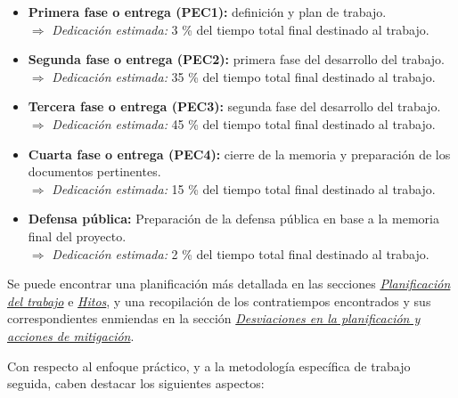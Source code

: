 \documentclass[IB,BIB]{TFUOC}%
\begin{document}
\footnotesize
\begin{itemize}
    \item \textbf{Primera fase o entrega (PEC1):} definición y plan de trabajo.\\
    \(\Rightarrow\) \textit{Dedicación estimada:} 3 \% del tiempo total final destinado al trabajo.
    \item \textbf{Segunda fase o entrega (PEC2):} primera fase del desarrollo del trabajo.\\
    \(\Rightarrow\) \textit{Dedicación estimada:} 35 \% del tiempo total final destinado al trabajo.
    \item \textbf{Tercera fase o entrega (PEC3):} segunda fase del desarrollo del trabajo.\\
    \(\Rightarrow\) \textit{Dedicación estimada:} 45 \% del tiempo total final destinado al trabajo.
    \item \textbf{Cuarta fase o entrega (PEC4):} cierre de la memoria y preparación de los documentos pertinentes.\\
    \(\Rightarrow\) \textit{Dedicación estimada:} 15 \% del tiempo total final destinado al trabajo.
    \item \textbf{Defensa pública:} Preparación de la defensa pública en base a la memoria final del proyecto.\\
    \(\Rightarrow\) \textit{Dedicación estimada:} 2 \% del tiempo total final destinado al trabajo.
\end{itemize}
\normalsize

Se puede encontrar una planificación más detallada en las secciones \textit{\hyperref[sec:Planificación del trabajo]{Planificación del trabajo}} e \textit{\hyperref[sec:Hitos]{Hitos}}, y una recopilación de los contratiempos encontrados y sus correspondientes enmiendas en la sección \textit{\hyperref[sec:Desviaciones en la planificación y acciones de mitigación]{Desviaciones en la planificación y acciones de mitigación}}.

\newpage
Con respecto al enfoque práctico, y a la metodología específica de trabajo seguida, caben destacar los siguientes aspectos:
\end{document}
